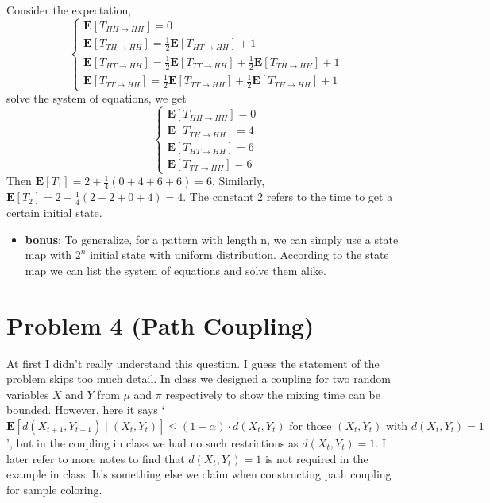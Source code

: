\documentclass{article}
\theoremstyle{definition}
\begin{document}
	Consider the expectation, 
	$$
	\left\{
	\begin{array}{l}
		\mathbf E[T_{HH\rightarrow HH}] = 0 \\
		\mathbf E[T_{TH\rightarrow HH}] = \frac{1}{2}\mathbf E[T_{HT\rightarrow HH}] + 1 \\
		\mathbf E[T_{HT\rightarrow HH}] = \frac{1}{2}\mathbf E[T_{TT\rightarrow HH}] + \frac{1}{2}\mathbf E[T_{TH\rightarrow HH}] + 1 \\
		\mathbf E[T_{TT\rightarrow HH}] = \frac{1}{2}\mathbf E[T_{TT\rightarrow HH}] + \frac{1}{2}\mathbf E[T_{TH\rightarrow HH}] + 1
	\end{array}
	\right.
	$$
	solve the system of equations, we get
	$$
	\left\{
	\begin{array}{l}
		\mathbf E[T_{HH\rightarrow HH}] = 0 \\
		\mathbf E[T_{TH\rightarrow HH}] = 4 \\
		\mathbf E[T_{HT\rightarrow HH}] = 6 \\
		\mathbf E[T_{TT\rightarrow HH}] = 6
	\end{array}
	\right.
	$$
	Then $\mathbf E[T_1] = 2 + \frac{1}{4}(0+4+6+6) = 6$. Similarly, $\mathbf E[T_2] = 2 + \frac{1}{4}(2+2+0+4) = 4$. The constant 2 refers to the time to get a certain initial state.
	\begin{itemize}
		\item \textbf{bonus}: To generalize, for a pattern with length n, we can simply use a state map with $2^n$ initial state with uniform distribution. According to the state map we can list the system of equations and solve them alike.
	\end{itemize}
	
	\section*{Problem 4 (Path Coupling)}
	At first I didn't really understand this question. I guess the statement of the problem skips too much detail. In class we designed a coupling for two random variables $X$ and $Y$ from $\mu$ and $\pi$ respectively to show the mixing time can be bounded. However, here it says `$\mathbf{E}\left[d\left(X_{t+1}, Y_{t+1}\right) \mid\left(X_t, Y_t\right)\right] \leq(1-\alpha) \cdot d\left(X_t, Y_t\right) \text { for those }\left(X_t, Y_t\right) \text { with } d\left(X_t, Y_t\right)=1$', but in the coupling in class we had no such restrictions as $d\left(X_t, Y_t\right)=1$. I later refer to more notes\cite{washington, mit6} to find that $d\left(X_t, Y_t\right)=1$ is not required in the example in class. It's something else we claim when constructing path coupling for sample coloring. 
	
\end{document}
